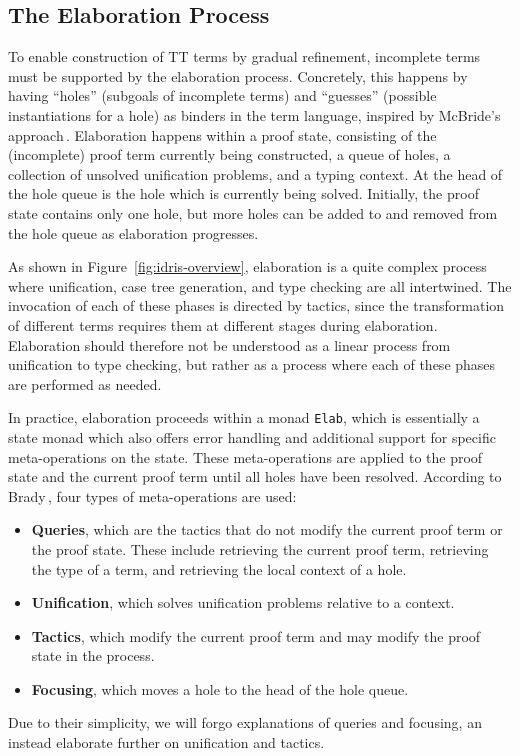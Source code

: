 \subsection{The Elaboration Process}
To enable construction of TT terms by gradual refinement, incomplete terms must
be supported by the elaboration process. Concretely, this happens by having
``holes'' (subgoals of incomplete terms) and ``guesses'' (possible
instantiations for a hole) as binders in the term language, inspired by
McBride's approach\,\citep{McBrideThesis:1999}. Elaboration happens within a
proof state, consisting of the (incomplete) proof term currently being
constructed, a queue of holes, a collection
of unsolved unification problems, and a typing context. At the head of the hole
queue is the hole which is currently being solved. Initially, the proof state
contains only one hole, but more holes can be added to and removed from the hole
queue as elaboration progresses.

As shown in Figure~\ref{fig:idris-overview}, elaboration is a quite complex
process where unification, case tree generation, and type checking are all
intertwined. The invocation of each of these phases is directed by tactics,
since the transformation of different terms requires them at different stages
during elaboration. Elaboration should therefore not be understood as a linear
process from unification to type checking, but rather as a process where each of
these phases are performed as needed.

In practice, elaboration proceeds within a monad \texttt{Elab}, which is
essentially a state monad which also offers error handling and additional
support for specific meta-operations on the state. These meta-operations are
applied to the proof state and the current proof term until all holes have been
resolved. According to Brady\,\citep{BradyIdrisImpl13}, four types of meta-operations are used:
\begin{itemize}
\item \textbf{Queries}, which are the tactics that do not modify the current
  proof term or the proof state. These include retrieving the current proof
  term, retrieving the type of a term, and retrieving the local context of a hole.
\item \textbf{Unification}, which solves unification problems relative to a context.
\item \textbf{Tactics}, which modify the current proof term and may modify the
  proof state in the process.
\item \textbf{Focusing}, which moves a hole to the head of the hole queue.
\end{itemize}
Due to their simplicity, we will forgo explanations of queries and
focusing, an instead elaborate further on unification and tactics.

